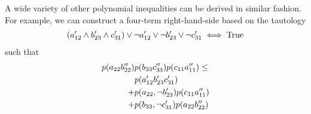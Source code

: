\begin{EDITING...}
A wide variety of other polynomial inequalities can be derived in similar fashion. For example, we can construct a four-term right-hand-side based on the tautology 
\begin{align*}
\parens*{a'_{12} \land b'_{23} \land c'_{31}} \lor \na'_{12} \lor \nb'_{23} \lor \nc'_{31}  \iff \mbox{True}
\end{align*}
such that
%
%
\begin{align}\begin{split}\label{eq:thirdsurety}
\p{a_{22} b''_{22}}&\p{b_{33} c''_{33}}\p{c_{11} a''_{11}}\leq
\\ &\p{a'_{12} b'_{23} c'_{31}}
\\+&\p{a_{22},\nb'_{23}}\p{c_{11} a''_{11}}
\\+&\p{b_{33},\nc'_{31}}\p{a_{22} b''_{22}}

\end{split}
\end{align}
\end{EDITING...}
